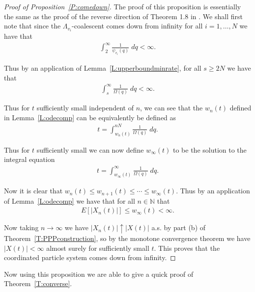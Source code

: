 \documentclass[11pt]{article}
\theoremstyle{definition}
\newcommand{\N}{\mathbb{N}}
\newcommand{\thmref}[1]{Theorem~\ref{T:#1}}
\newcommand{\lemref}[1]{Lemma~\ref{L:#1}}
\newcommand{\propref}[1]{Proposition~\ref{P:#1}}
\begin{document}
\begin{proof}[Proof of \propref{comedown}]
    The proof of this proposition is essentially the same as the proof of the reverse direction of Theorem 1.8 in \cite{Johnston2023}. We shall first note that since the $\Lambda_{v_i}$-coalescent comes down from infinity for all $i = 1, \ldots, N$ we have that
    \begin{align*}
        \int_2^\infty \frac{1}{\psi_{v_i}(q)}\;dq < \infty.
    \end{align*}

    \noindent Thus by an application of \lemref{upperboundminrate}, for all $s \geq 2N$ we have that
    \begin{align*}
        \int_{s}^\infty \frac{1}{\Omega(q)}\;dq < \infty.
    \end{align*}

    \noindent Thus for $t$ sufficiently small independent of $n$, we can see that the $w_n(t)$ defined in \lemref{odecomp} can be equivalently be defined as
    \begin{align*}
        t = \int_{w_n(t)}^{nN} \frac{1}{\Omega(q)}\;dq.
    \end{align*}

    \noindent Thus for $t$ sufficiently small we can now define $w_\infty(t)$ to be the solution to the integral equation
    \begin{align*}
        t = \int_{w_\infty(t)}^\infty \frac{1}{\Omega(q)}\;dq.
    \end{align*}

    \noindent Now it is clear that $w_n(t) \leq w_{n+1}(t) \leq \cdots \leq w_\infty(t)$. Thus by an application of \lemref{odecomp} we have that for all $n \in \N$ that
    \begin{align*}
        E[|X_n(t)|] \leq w_\infty(t) < \infty.
    \end{align*}

    \noindent Now taking $n \to \infty$ we have $|X_n(t)| \uparrow |X(t)|$ a.s. by part (b) of \thmref{PPPconstruction}, so by the monotone convergence theorem we have $|X(t)| < \infty$ almost surely for sufficiently small $t$. This proves that the coordinated particle system comes down from infinity.
\end{proof}


\noindent Now using this proposition we are able to give a quick proof of \thmref{converse}.
\end{document}
